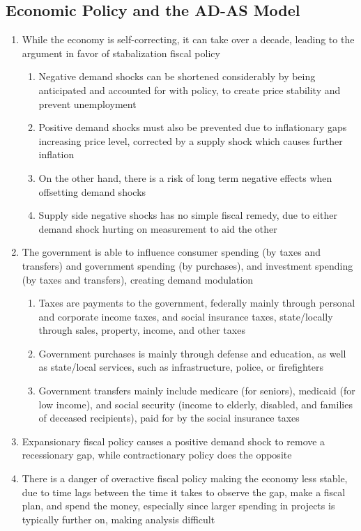 \documentclass[11 pt, twoside]{article}
\begin{document}
\subsection{Economic Policy and the AD-AS Model}
\begin{enumerate}
\item While the economy is self-correcting, it can take over a decade, leading to the argument in favor of stabalization fiscal policy
\begin{enumerate}
\item Negative demand shocks can be shortened considerably by being anticipated and accounted for with policy, to create price stability and prevent unemployment
\item Positive demand shocks must also be prevented due to inflationary gaps increasing price level, corrected by a supply shock which causes further inflation
\item On the other hand, there is a risk of long term negative effects when offsetting demand shocks
\item Supply side negative shocks has no simple fiscal remedy, due to either demand shock hurting on measurement to aid the other
\end{enumerate}
\item The government is able to influence consumer spending (by taxes and transfers) and government spending (by purchases), and investment spending (by taxes and transfers), creating demand modulation
\begin{enumerate}
\item Taxes are payments to the government, federally mainly through personal and corporate income taxes, and social insurance taxes, state/locally through sales, property, income, and other taxes
\item Government purchases is mainly through defense and education, as well as state/local services, such as infrastructure, police, or firefighters
\item Government transfers mainly include medicare (for seniors), medicaid (for low income), and social security (income to elderly, disabled, and families of deceased recipients), paid for by the social insurance taxes
\end{enumerate}
\item Expansionary fiscal policy causes a positive demand shock to remove a recessionary gap, while contractionary policy does the opposite
\item There is a danger of overactive fiscal policy making the economy less stable, due to time lags between the time it takes to observe the gap, make a fiscal plan, and spend the money, especially since larger spending in projects is typically further on, making analysis difficult
\end{enumerate}
\end{document}
